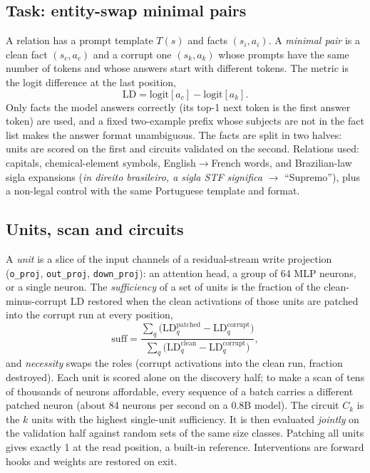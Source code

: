 \documentclass[11pt]{article}
\newcommand{\code}[1]{\texttt{#1}}
\begin{document}
\subsection{Task: entity-swap minimal pairs}
A relation has a prompt template $T(s)$ and facts $(s_i,a_i)$. A \emph{minimal pair} is a clean fact $(s_c,a_c)$ and a corrupt one
$(s_k,a_k)$ whose prompts have the same number of tokens and whose answers start with different tokens. The metric is the logit
difference at the last position,
\begin{equation}
\mathrm{LD}=\mathrm{logit}[a_c]-\mathrm{logit}[a_k].
\end{equation}
Only facts the model answers correctly (its top-1 next token is the first answer token) are used, and a fixed two-example prefix whose subjects are
not in the fact list makes the answer format unambiguous. The facts are split in two halves: units are scored on the first and circuits validated on
the second. Relations used: capitals, chemical-element symbols, English$\to$French words, and Brazilian-law sigla expansions (\emph{in direito
brasileiro, a sigla STF significa} $\to$ ``Supremo''), plus a non-legal control with the same Portuguese template and format.

\subsection{Units, scan and circuits}
A \emph{unit} is a slice of the input channels of a residual-stream write projection (\code{o\_proj}, \code{out\_proj}, \code{down\_proj}): an attention head,
a group of 64 MLP neurons, or a single neuron. The \emph{sufficiency} of a set of units is the fraction of the clean-minus-corrupt $\mathrm{LD}$ restored when the clean
activations of those units are patched into the corrupt run at every position,
\begin{equation}
\mathrm{suff}=\frac{\sum_q\bigl(\mathrm{LD}^{\mathrm{patched}}_q-\mathrm{LD}^{\mathrm{corrupt}}_q\bigr)}{\sum_q\bigl(\mathrm{LD}^{\mathrm{clean}}_q-\mathrm{LD}^{\mathrm{corrupt}}_q\bigr)},
\end{equation}
and \emph{necessity} swaps the roles (corrupt activations into the clean run, fraction destroyed). Each unit is scored alone on the discovery half; to make a
scan of tens of thousands of neurons affordable, every sequence of a batch carries a different patched neuron (about 84 neurons per second on a 0.8B model).
The circuit $C_k$ is the $k$ units with the highest single-unit sufficiency. It is then evaluated \emph{jointly} on the validation half against random sets
of the same size classes. Patching all units gives exactly 1 at the read position, a built-in reference. Interventions are forward hooks and weights are restored on exit.
\end{document}
